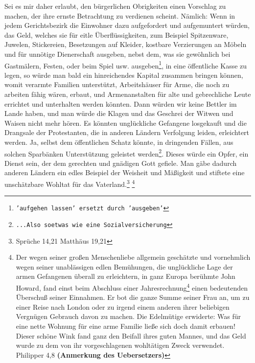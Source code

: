 Sei es mir daher erlaubt, den bürgerlichen
Obrigkeiten einen Vorschlag zu machen,
der ihre ernste Betrachtung zu verdienen scheint. Nämlich: Wenn in jedem
Gerichtsbezirk die Einwohner dazu aufgefordert und aufgemuntert würden, das
Geld, welches sie für eitle Überflüssigkeiten, zum Beispiel Spitzenware, Juwelen,
Stickereien, Besetzungen auf Kleider, kostbare Verzierungen an Möbeln und für
unnötige Dienerschaft ausgeben, nebst dem, was sie gewöhnlich bei Gastmälern,
Festen, oder beim Spiel usw. ausgeben\footnote{\texttt{'aufgehen lassen'
ersetzt durch 'ausgeben'}}, in eine öffentliche Kasse zu
legen, so würde man bald ein hinreichendes Kapital zusammen bringen können,
womit verarmte Familien unterstützt, Arbeitshäuser für Arme, die noch zu
arbeiten fähig wären, erbaut, und Armenanstalten für alte und
gebrechliche
Leute errichtet und unterhalten werden könnten. Dann
würden wir keine Bettler im Lande haben, und man würde
die Klagen
und das
Geschrei der Witwen und Waisen nicht mehr hören. Es könnten unglückliche
Gefangene losgekauft und die Drangsale der Protestanten, die in anderen Ländern
Verfolgung leiden, erleichtert werden. Ja,
selbst dem öffentlichen Schatz könnte, in dringenden
Fällen, aus solchen
Sparbänken Unterstützung geleistet werden\footnote{\texttt{...Also soetwas wie
eine Sozialversicherung}}. Dieses würde ein Opfer, ein Dienst
sein, der dem gerechten und gnädigen Gott gefiele. Man gäbe dadurch anderen
Ländern ein edles Beispiel der Weisheit und Mäßigkeit und stiftete eine
unschätzbare Wohltat für das Vaterland.\footnote{Sprüche 14,21
Matthäus 19,21}
\footnote{Der wegen seiner großen
Menschenliebe allgemein geschätzte und vornehmlich wegen seiner unablässigen
edlen Bemühungen, die unglückliche Lage der armen Gefangenen überall zu
erleichtern, in ganz Europa berühmte John Howard,
fand einst beim Abschluss
einer Jahresrechnung\footnote{\texttt{...Also Jahresbilanz.}} einen bedeutenden
Überschuß seiner Einnahmen. Er bot die
ganze Summe seiner Frau an, um zu einer Reise nach London
oder zu irgend
einem anderen ihrer beliebigen Vergnügen Gebrauch davon zu machen. Die
Edelmütige
erwiderte: Was für eine nette Wohnung für eine arme Familie ließe sich doch
damit erbauen! Dieser schöne Wink fand ganz den Beifall
ihres guten Mannes, und das Geld wurde zu dem von ihr vorgeschlagenen
wohltätigen Zweck verwendet. Philipper 4,8
\textbf{(Anmerkung des Uebersetzers)}}

